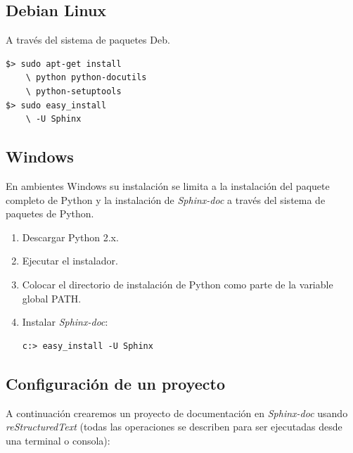 \documentclass{sig-alternate}
\begin{document}
	\subsection{Debian Linux}
		A trav\'es del sistema de paquetes Deb.
		
	\begin{lstlisting}
$> sudo apt-get install 
	\ python python-docutils 
	\ python-setuptools
$> sudo easy_install
	\ -U Sphinx 
	\end{lstlisting}
	
	\subsection{Windows}
		En ambientes Windows su instalaci\'on se limita a la instalaci\'on del paquete 
		completo de Python y la instalaci\'on de \emph{Sphinx-doc} a trav\'es del sistema
		de paquetes de Python.
		\begin{enumerate}
			\item Descargar Python 2.x.
			\item Ejecutar el instalador.
			\item Colocar el directorio de instalaci\'on de Python como 
				parte de la variable global PATH.
			\item Instalar \emph{Sphinx-doc}:
	\begin{lstlisting}
c:> easy_install -U Sphinx 
	\end{lstlisting}
		\end{enumerate}
	
	\subsection{Configuraci\'on de un proyecto}
		
		A continuaci\'on crearemos un proyecto de documentaci\'on en \emph{Sphinx-doc}
		usando \emph{reStructuredText} (todas las operaciones se describen
		para ser ejecutadas desde una terminal o consola):
		
\end{document}
